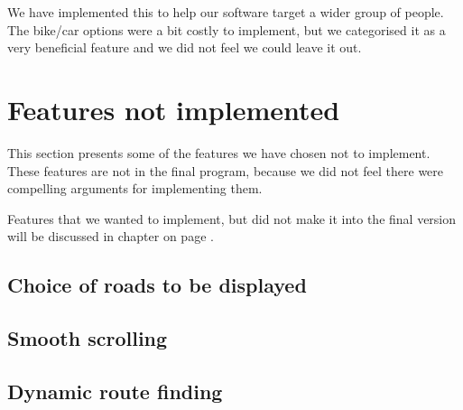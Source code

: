 We have implemented this to help our software target a wider group of people.
The bike/car options were a bit costly to implement, but we categorised it as a
very beneficial feature and we did not feel we could leave it out.
\section{Features not implemented}
\label{UIA-NI}
This section presents some of the features we have chosen not to implement.
These features are not in the final program, because we did not feel there were
compelling arguments for implementing them.

Features that we wanted to implement, but did not make it into the final version
will be discussed in chapter  on page \pageref{PRC}.
\subsection{Choice of roads to be displayed}
\label{UIA-NI-CRD}
\subsection{Smooth scrolling}
\label{UIA-NI-SS}
\subsection{Dynamic route finding}
\label{UIA-NI-DRF}